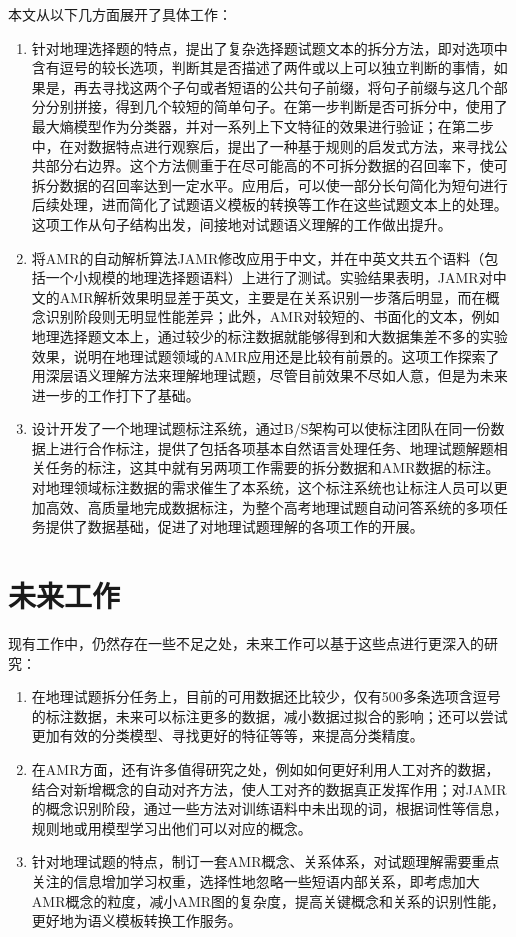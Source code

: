 \documentclass[master, winfont]{njuthesis}
\begin{document}
本文从以下几方面展开了具体工作：
\begin{enumerate}
  \item 针对地理选择题的特点，提出了复杂选择题试题文本的拆分方法，即对选项中含有逗号的较长选项，判断其是否描述了两件或以上可以独立判断的事情，如果是，再去寻找这两个子句或者短语的公共句子前缀，将句子前缀与这几个部分分别拼接，得到几个较短的简单句子。在第一步判断是否可拆分中，使用了最大熵模型作为分类器，并对一系列上下文特征的效果进行验证；在第二步中，在对数据特点进行观察后，提出了一种基于规则的启发式方法，来寻找公共部分右边界。这个方法侧重于在尽可能高的不可拆分数据的召回率下，使可拆分数据的召回率达到一定水平。应用后，可以使一部分长句简化为短句进行后续处理，进而简化了试题语义模板的转换等工作在这些试题文本上的处理。这项工作从句子结构出发，间接地对试题语义理解的工作做出提升。
  \item 将AMR的自动解析算法JAMR修改应用于中文，并在中英文共五个语料（包括一个小规模的地理选择题语料）上进行了测试。实验结果表明，JAMR对中文的AMR解析效果明显差于英文，主要是在关系识别一步落后明显，而在概念识别阶段则无明显性能差异；此外，AMR对较短的、书面化的文本，例如地理选择题文本上，通过较少的标注数据就能够得到和大数据集差不多的实验效果，说明在地理试题领域的AMR应用还是比较有前景的。这项工作探索了用深层语义理解方法来理解地理试题，尽管目前效果不尽如人意，但是为未来进一步的工作打下了基础。
  \item 设计开发了一个地理试题标注系统，通过B/S架构可以使标注团队在同一份数据上进行合作标注，提供了包括各项基本自然语言处理任务、地理试题解题相关任务的标注，这其中就有另两项工作需要的拆分数据和AMR数据的标注。对地理领域标注数据的需求催生了本系统，这个标注系统也让标注人员可以更加高效、高质量地完成数据标注，为整个高考地理试题自动问答系统的多项任务提供了数据基础，促进了对地理试题理解的各项工作的开展。
  \end{enumerate}

\section{未来工作}
现有工作中，仍然存在一些不足之处，未来工作可以基于这些点进行更深入的研究：
\begin{enumerate}
  \item 在地理试题拆分任务上，目前的可用数据还比较少，仅有500多条选项含逗号的标注数据，未来可以标注更多的数据，减小数据过拟合的影响；还可以尝试更加有效的分类模型、寻找更好的特征等等，来提高分类精度。
  \item 在AMR方面，还有许多值得研究之处，例如如何更好利用人工对齐的数据，结合对新增概念的自动对齐方法，使人工对齐的数据真正发挥作用；对JAMR的概念识别阶段，通过一些方法对训练语料中未出现的词，根据词性等信息，规则地或用模型学习出他们可以对应的概念。
  \item 针对地理试题的特点，制订一套AMR概念、关系体系，对试题理解需要重点关注的信息增加学习权重，选择性地忽略一些短语内部关系，即考虑加大AMR概念的粒度，减小AMR图的复杂度，提高关键概念和关系的识别性能，更好地为语义模板转换工作服务。
\end{enumerate}
\end{document}
